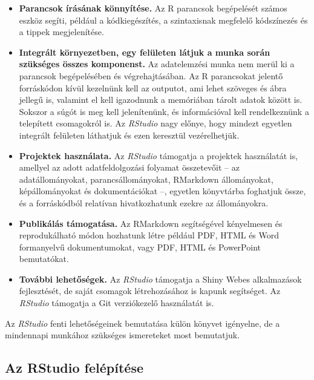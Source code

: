 \documentclass[
]{book}
\providecommand{\tightlist}{%
  \setlength{\itemsep}{0pt}\setlength{\parskip}{0pt}}
\begin{document}
\begin{itemize}
\tightlist
\item
  \textbf{Parancsok írásának könnyítése.} Az R parancsok begépelését számos eszköz segíti, például a kódkiegészítés, a szintaxisnak megfelelő kódszínezés és a tippek megjelenítése.
\item
  \textbf{Integrált környezetben, egy felületen látjuk a munka során szükséges összes komponenst.} Az adatelemzési munka nem merül ki a parancsok begépelésében és végrehajtásában. Az R parancsokat jelentő forráskódon kívül kezelnünk kell az outputot, ami lehet szöveges és ábra jellegű is, valamint el kell igazodnunk a memóriában tárolt adatok között is. Sokszor a súgót is meg kell jelenítenünk, és információval kell rendelkeznünk a telepített csomagokról is. Az \emph{RStudio} nagy előnye, hogy mindezt egyetlen integrált felületen láthatjuk és ezen keresztül vezérelhetjük.
\item
  \textbf{Projektek használata.} Az \emph{RStudio} támogatja a projektek használatát is, amellyel az adott adatfeldolgozási folyamat összetevőit -- az adatállományokat, parancsállományokat, RMarkdown állományokat, képállományokat és dokumentációkat --, egyetlen könyvtárba foghatjuk össze, és a forráskódból relatívan hivatkozhatunk ezekre az állományokra.
\item
  \textbf{Publikálás támogatása.} Az RMarkdown segítségével kényelmesen és reprodukálható módon hozhatunk létre például PDF, HTML és Word formanyelvű dokumentumokat, vagy PDF, HTML és PowerPoint bemutatókat.
\item
  \textbf{További lehetőségek.} Az \emph{RStudio} támogatja a Shiny Webes alkalmazások fejlesztését, de saját csomagok létrehozásához is kapunk segítséget. Az \emph{RStudio} támogatja a Git verziókezelő használatát is.
\end{itemize}

Az \emph{RStudio} fenti lehetőségeinek bemutatása külön könyvet igényelne, de a mindennapi munkához szükséges ismereteket most bemutatjuk.

\hypertarget{az-rstudio-felepitese}{%
\subsection{Az RStudio felépítése}\label{az-rstudio-felepitese}}
\end{document}
